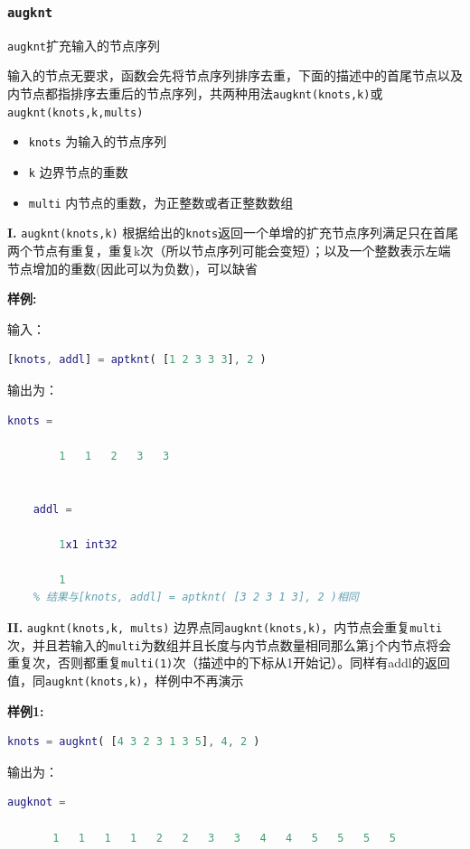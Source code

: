 \subsubsection{\texttt{augknt}}

\texttt{augknt}扩充输入的节点序列

输入的节点无要求，函数会先将节点序列排序去重，下面的描述中的首尾节点以及内节点都指排序去重后的节点序列，共两种用法\texttt{augknt(knots,k)}或\texttt{augknt(knots,k,mults)}
\begin{itemize}
    \item \texttt{knots} 为输入的节点序列
    \item \texttt{k} 边界节点的重数
    \item \texttt{multi} 内节点的重数，为正整数或者正整数数组
\end{itemize}

\textbf{I.} 
\texttt{augknt(knots,k)} 根据给出的\texttt{knots}返回一个单增的扩充节点序列满足只在首尾两个节点有重复，重复k次（所以节点序列可能会变短）；以及一个整数表示左端节点增加的重数(因此可以为负数)，可以缺省

\textbf{样例:}

输入：
\begin{lstlisting}[language = matlab]
    [knots, addl] = aptknt( [1 2 3 3 3], 2 )
\end{lstlisting}

 输出为：
\begin{lstlisting}[language = matlab ]
    knots = 

        1   1   2   3   3


    addl = 

        1x1 int32

        1
    % 结果与[knots, addl] = aptknt( [3 2 3 1 3], 2 )相同
\end{lstlisting}

\textbf{II.}
\texttt{augknt(knots,k, mults)} 边界点同\texttt{augknt(knots,k)}，内节点会重复\texttt{multi}次，并且若输入的\texttt{multi}为数组并且长度与内节点数量相同那么第\texttt{j}个内节点将会重复次，否则都重复\texttt{multi(1)}次（描述中的下标从1开始记）。同样有addl的返回值，同\texttt{augknt(knots,k)}，样例中不再演示

\textbf{样例1:}

\begin{lstlisting}[language = matlab]
    knots = augknt( [4 3 2 3 1 3 5], 4, 2 )
\end{lstlisting}

 输出为：
\begin{lstlisting}[language = matlab ]
    augknot = 

       1   1   1   1   2   2   3   3   4   4   5   5   5   5
\end{lstlisting}

